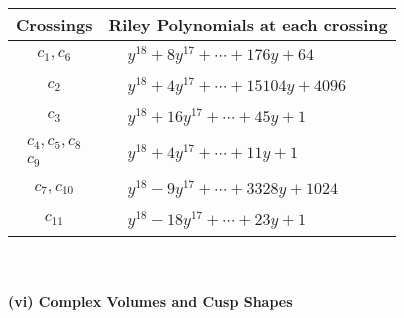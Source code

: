 \documentclass[1p]{elsarticle_modified}
\theoremstyle{definition}
\begin{document}
\begin{tabular}{m{50pt}|m{274pt}}
Crossings & \hspace{64pt}Riley Polynomials at each crossing \\
\hline $$\begin{aligned}c_{1},c_{6}\end{aligned}$$&$\begin{aligned}
&y^{18}+8 y^{17}+\cdots+176 y+64
\end{aligned}$\\
\hline $$\begin{aligned}c_{2}\end{aligned}$$&$\begin{aligned}
&y^{18}+4 y^{17}+\cdots+15104 y+4096
\end{aligned}$\\
\hline $$\begin{aligned}c_{3}\end{aligned}$$&$\begin{aligned}
&y^{18}+16 y^{17}+\cdots+45 y+1
\end{aligned}$\\
\hline $$\begin{aligned}c_{4},c_{5},c_{8}\\c_{9}\end{aligned}$$&$\begin{aligned}
&y^{18}+4 y^{17}+\cdots+11 y+1
\end{aligned}$\\
\hline $$\begin{aligned}c_{7},c_{10}\end{aligned}$$&$\begin{aligned}
&y^{18}-9 y^{17}+\cdots+3328 y+1024
\end{aligned}$\\
\hline $$\begin{aligned}c_{11}\end{aligned}$$&$\begin{aligned}
&y^{18}-18 y^{17}+\cdots+23 y+1
\end{aligned}$\\
\hline
\end{tabular}\\~\\
\newpage\flushleft \textbf{(vi) Complex Volumes and Cusp Shapes}
\end{document}
